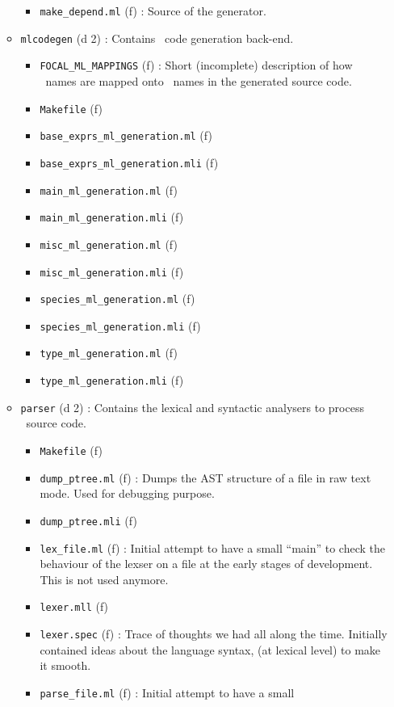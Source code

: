 \begin{itemize}
\begin{itemize}
\begin{itemize}
    \item {\tt make\_depend.ml} (f) : Source of the generator.
    \end{itemize}
  \item {\tt mlcodegen} (d 2) : Contains \ocaml\ code generation back-end.
    \begin{itemize}
    \item {\tt FOCAL\_ML\_MAPPINGS} (f) : Short (incomplete) description
      of how \focalize\ names are mapped onto \ocaml\ names in the
      generated source code.
    \item {\tt Makefile} (f)
    \item {\tt base\_exprs\_ml\_generation.ml} (f)
    \item {\tt base\_exprs\_ml\_generation.mli} (f)
    \item {\tt main\_ml\_generation.ml} (f)
    \item {\tt main\_ml\_generation.mli} (f)
    \item {\tt misc\_ml\_generation.ml} (f)
    \item {\tt misc\_ml\_generation.mli} (f)
    \item {\tt species\_ml\_generation.ml} (f)
    \item {\tt species\_ml\_generation.mli} (f)
    \item {\tt type\_ml\_generation.ml} (f)
    \item {\tt type\_ml\_generation.mli} (f)
    \end{itemize}
  \item {\tt parser} (d 2) : Contains the lexical and syntactic
    analysers to process \focalize\ source code.
    \begin{itemize}
    \item {\tt Makefile} (f)
    \item {\tt dump\_ptree.ml} (f) : Dumps the AST structure of a file
      in raw text mode. Used for debugging purpose.
    \item {\tt dump\_ptree.mli} (f)
    \item {\tt lex\_file.ml} (f) : Initial attempt to have a small
      ``main'' to check the behaviour of the lexser on a file at the
      early stages of development. This is not used anymore.
    \item {\tt lexer.mll} (f)
    \item {\tt lexer.spec} (f) : Trace of thoughts we had all along
      the time. Initially contained ideas about the language syntax,
      (at lexical level) to make it smooth.
    \item {\tt parse\_file.ml} (f) : Initial attempt to have a small

\end{itemize}
\end{itemize}
\end{itemize}
